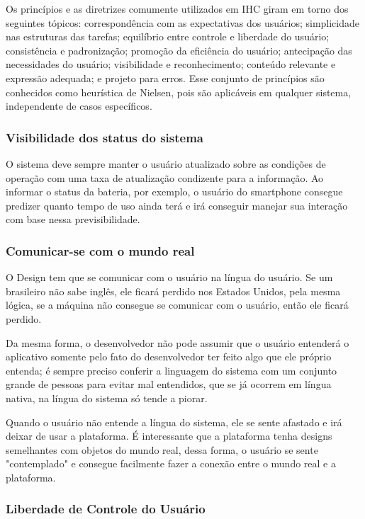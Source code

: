 Os princípios e as diretrizes comumente utilizados em IHC giram em torno dos seguintes tópicos: correspondência com as expectativas dos usuários; simplicidade nas estruturas das tarefas; equilíbrio entre controle e liberdade do usuário; consistência e padronização; promoção da eficiência do usuário; antecipação das necessidades do usuário; visibilidade e reconhecimento; conteúdo relevante e expressão adequada; e projeto para erros.  \cite{BarbosaEtAl2021InteracaoHumanoComputadorExperiencia}
Esse conjunto de princípios são conhecidos como heurística de Nielsen, pois são aplicáveis em qualquer sistema, independente de casos específicos.

\subsubsection{Visibilidade dos status do sistema}

O sistema deve sempre manter o usuário atualizado sobre as condições de operação com uma taxa de atualização condizente para a informação. Ao informar o status da bateria, por exemplo, o usuário do smartphone consegue predizer quanto tempo de uso ainda terá e irá conseguir manejar sua interação com base nessa previsibilidade. \cite{site:nielsen}

\subsubsection{Comunicar-se com o mundo real}
O Design tem que se comunicar com o usuário na língua do usuário. Se um brasileiro não sabe inglês, ele ficará perdido nos Estados Unidos, pela mesma lógica, se a máquina não consegue se comunicar com o usuário, então ele ficará perdido.

Da mesma forma, o desenvolvedor não pode assumir que o usuário entenderá o aplicativo somente pelo fato do desenvolvedor ter feito algo que ele próprio entenda; é sempre preciso conferir a linguagem do sistema com um conjunto grande de pessoas para evitar mal entendidos, que se já ocorrem em língua nativa, na língua do sistema só tende a piorar.

Quando o usuário não entende a língua do sistema, ele se sente afastado e irá deixar de usar a plataforma. É interessante que a plataforma tenha designs semelhantes com objetos do mundo real, dessa forma, o usuário se sente "contemplado" e consegue facilmente fazer a conexão entre o mundo real e a plataforma. \cite{site:nielsenRealWorld}

\subsubsection{Liberdade de Controle do Usuário}

